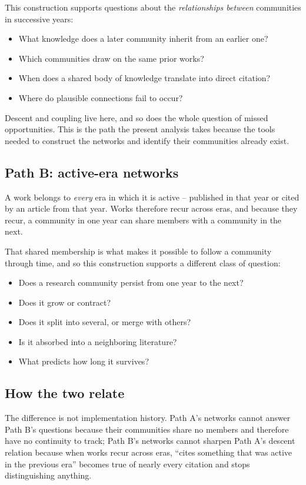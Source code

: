 \documentclass[11pt]{article}
\begin{document}
This construction supports questions about the \emph{relationships between} communities
in successive years:

\begin{itemize}[leftmargin=2em]
  \item What knowledge does a later community inherit from an earlier one?
  \item Which communities draw on the same prior works?
  \item When does a shared body of knowledge translate into direct citation?
  \item Where do plausible connections fail to occur?
\end{itemize}

Descent and coupling live here, and so does the whole question of missed opportunities.
This is the path the present analysis takes because the tools needed to construct the
networks and identify their communities already exist.

\subsection{Path B: active-era networks}

A work belongs to \emph{every} era in which it is active -- published in that year or
cited by an article from that year. Works therefore recur across eras, and because they
recur, a community in one year can share members with a community in the next.

That shared membership is what makes it possible to follow a community through time, and
so this construction supports a different class of question:

\begin{itemize}[leftmargin=2em]
  \item Does a research community persist from one year to the next?
  \item Does it grow or contract?
  \item Does it split into several, or merge with others?
  \item Is it absorbed into a neighboring literature?
  \item What predicts how long it survives?
\end{itemize}

\subsection{How the two relate}

The difference is not implementation history. Path A's networks cannot answer Path B's
questions because their communities share no members and therefore have no continuity to
track; Path B's networks cannot sharpen Path A's descent relation because when works
recur across eras, ``cites something that was active in the previous era'' becomes true
of nearly every citation and stops distinguishing anything.
\end{document}
